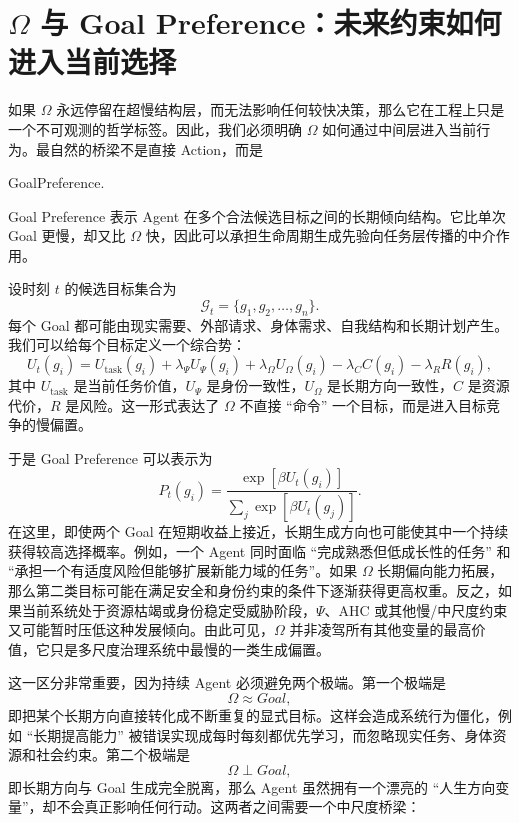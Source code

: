 \section{$\Omega$ 与 Goal Preference：未来约束如何进入当前选择}

如果 $\Omega$ 永远停留在超慢结构层，而无法影响任何较快决策，那么它在工程上只是一个不可观测的哲学标签。因此，我们必须明确 $\Omega$ 如何通过中间层进入当前行为。最自然的桥梁不是直接 Action，而是
\begin{statementbox}
GoalPreference.
\end{statementbox}
Goal Preference 表示 Agent 在多个合法候选目标之间的长期倾向结构。它比单次 Goal 更慢，却又比 $\Omega$ 快，因此可以承担生命周期生成先验向任务层传播的中介作用。

设时刻 $t$ 的候选目标集合为
\[
\mathcal G_t
=
\{g_1,g_2,\ldots,g_n\}.
\]
每个 Goal 都可能由现实需要、外部请求、身体需求、自我结构和长期计划产生。我们可以给每个目标定义一个综合势：
\[
U_t(g_i)
=
U_{\text{task}}(g_i)
+
\lambda_{\Psi}U_{\Psi}(g_i)
+
\lambda_{\Omega}U_{\Omega}(g_i)
-
\lambda_C C(g_i)
-
\lambda_R R(g_i),
\]
其中 $U_{\text{task}}$ 是当前任务价值，$U_{\Psi}$ 是身份一致性，$U_{\Omega}$ 是长期方向一致性，$C$ 是资源代价，$R$ 是风险。这一形式表达了 $\Omega$ 不直接 ``命令'' 一个目标，而是进入目标竞争的慢偏置。

于是 Goal Preference 可以表示为
\[
P_t(g_i)
=
\frac{
\exp[\beta U_t(g_i)]
}{
\sum_j\exp[\beta U_t(g_j)]
}.
\]
在这里，即使两个 Goal 在短期收益上接近，长期生成方向也可能使其中一个持续获得较高选择概率。例如，一个 Agent 同时面临 ``完成熟悉但低成长性的任务'' 和 ``承担一个有适度风险但能够扩展新能力域的任务''。如果 $\Omega$ 长期偏向能力拓展，那么第二类目标可能在满足安全和身份约束的条件下逐渐获得更高权重。反之，如果当前系统处于资源枯竭或身份稳定受威胁阶段，$\Psi$、AHC 或其他慢/中尺度约束又可能暂时压低这种发展倾向。由此可见，$\Omega$ 并非凌驾所有其他变量的最高价值，它只是多尺度治理系统中最慢的一类生成偏置。

这一区分非常重要，因为持续 Agent 必须避免两个极端。第一个极端是
\[
\Omega\approx Goal,
\]
即把某个长期方向直接转化成不断重复的显式目标。这样会造成系统行为僵化，例如 ``长期提高能力'' 被错误实现成每时每刻都优先学习，而忽略现实任务、身体资源和社会约束。第二个极端是
\[
\Omega\perp Goal,
\]
即长期方向与 Goal 生成完全脱离，那么 Agent 虽然拥有一个漂亮的 ``人生方向变量''，却不会真正影响任何行动。这两者之间需要一个中尺度桥梁：
\begin{statementbox}
\centering
{}
\end{statementbox}

